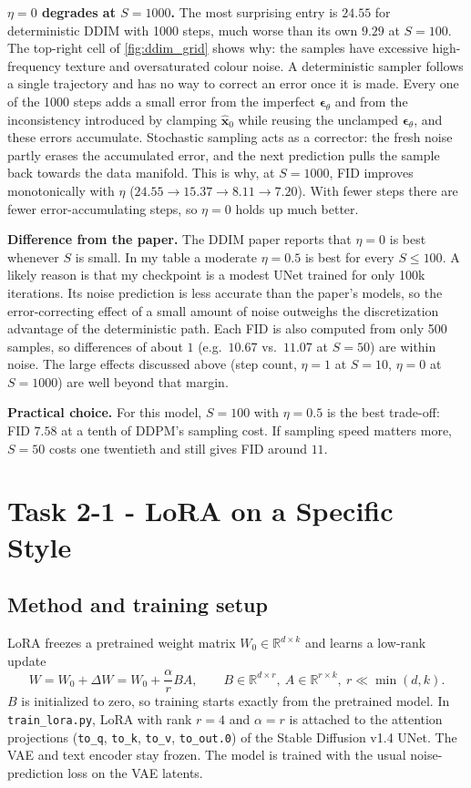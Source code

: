 \documentclass[a4paper]{article} %
\begin{document}
\textbf{$\eta=0$ degrades at $S=1000$.} The most surprising entry is $24.55$ for deterministic DDIM
with 1000 steps, much worse than its own $9.29$ at $S=100$. The top-right cell of
\autoref{fig:ddim_grid} shows why: the samples have excessive high-frequency texture and
oversaturated colour noise. A deterministic sampler follows a single trajectory and has no way to
correct an error once it is made. Every one of the 1000 steps adds a small error from the imperfect
$\boldsymbol{\epsilon}_\theta$ and from the inconsistency introduced by clamping
$\hat{\mathbf{x}}_0$ while reusing the unclamped $\boldsymbol{\epsilon}_\theta$, and these errors
accumulate. Stochastic sampling acts as a corrector: the fresh noise partly erases the accumulated
error, and the next prediction pulls the sample back towards the data manifold. This is why, at
$S=1000$, FID improves monotonically with $\eta$ ($24.55 \rightarrow 15.37 \rightarrow 8.11
\rightarrow 7.20$). With fewer steps there are fewer error-accumulating steps, so $\eta=0$ holds up
much better.

\textbf{Difference from the paper.} The DDIM paper reports that $\eta=0$ is best whenever $S$ is
small. In my table a moderate $\eta=0.5$ is best for every $S \le 100$. A likely reason is that my
checkpoint is a modest UNet trained for only 100k iterations. Its noise prediction is less accurate
than the paper's models, so the error-correcting effect of a small amount of noise outweighs the
discretization advantage of the deterministic path. Each FID is also computed from only 500 samples,
so differences of about $1$ (e.g.\ $10.67$ vs.\ $11.07$ at $S=50$) are within noise. The large
effects discussed above (step count, $\eta=1$ at $S=10$, $\eta=0$ at $S=1000$) are well beyond that
margin.

\textbf{Practical choice.} For this model, $S=100$ with $\eta=0.5$ is the best trade-off: FID
$7.58$ at a tenth of DDPM's sampling cost. If sampling speed matters more, $S=50$ costs one
twentieth and still gives FID around $11$.


\section{Task 2-1 - LoRA on a Specific Style}

\subsection{Method and training setup}

LoRA freezes a pretrained weight matrix $W_0\in\mathbb{R}^{d\times k}$ and learns a low-rank update
\begin{equation}
    W = W_0 + \Delta W = W_0 + \frac{\alpha}{r} BA,\qquad B\in\mathbb{R}^{d\times r},\ A\in\mathbb{R}^{r\times k},\ r\ll\min(d,k).
\end{equation}
$B$ is initialized to zero, so training starts exactly from the pretrained model. In
\texttt{train\_lora.py}, LoRA with rank $r=4$ and $\alpha=r$ is attached to the attention
projections (\texttt{to\_q}, \texttt{to\_k}, \texttt{to\_v}, \texttt{to\_out.0}) of the Stable
Diffusion v1.4 UNet. The VAE and text encoder stay frozen. The model is trained with the usual
noise-prediction loss on the VAE latents.
\end{document}
